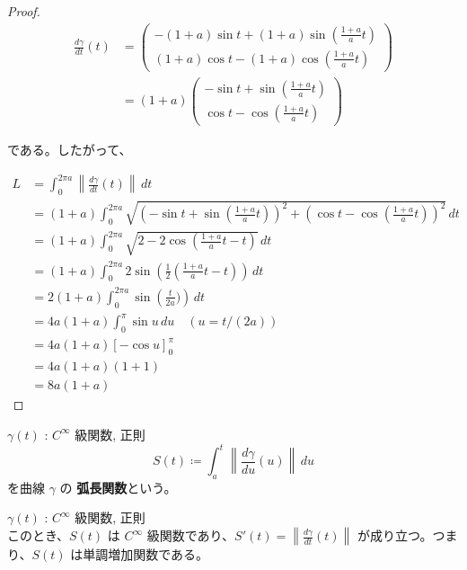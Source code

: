 \documentclass[article,paper=a4paper]{jlreq}
\begin{document}
\begin{proof}
    \begin{align*}
        \frac{d\gamma}{dt}(t) &= \begin{pmatrix}
        -(1+a)\sin t + (1+a)\sin\left(\frac{1+a}{a}t\right) \\
        (1+a)\cos t - (1+a)\cos\left(\frac{1+a}{a}t\right)
        \end{pmatrix}\\
        &= (1+a) \begin{pmatrix}
        -\sin t + \sin\left(\frac{1+a}{a}t\right) \\
        \cos t - \cos\left(\frac{1+a}{a}t\right)
        \end{pmatrix}
    \end{align*}

    である。したがって、

    \begin{align*}
        L &= \int_0^{2\pi a} \left\|\frac{d\gamma}{dt}(t)\right\| \,dt \\
        &= (1+a) \int_0^{2\pi a} \sqrt{(-\sin t + \sin\left(\frac{1+a}{a}t\right))^2 + (\cos t - \cos\left(\frac{1+a}{a}t\right))^2} \,dt \\
        &= (1+a) \int_0^{2\pi a} \sqrt{2 - 2\cos\left(\frac{1+a}{a}t - t\right)} \,dt \\
        &= (1+a) \int_0^{2\pi a} 2\sin\left(\frac{1}{2}\left(\frac{1+a}{a}t - t\right)\right) \,dt \\
        &= 2(1+a) \int_0^{2\pi a} \sin\left(\frac{t}{2a})\right) \,dt \\
        &= 4a(1+a) \int_0^{\pi} \sin u \,du \quad (u = t/(2a)) \\
        &= 4a(1+a) \left[-\cos u\right]_0^{\pi} \\
        &= 4a(1+a) (1 + 1) \\
        &= 8a(1+a)
    \end{align*}
\end{proof}

\begin{dfn}
    \quad $\gamma(t)$ : $C^{\infty}$ 級関数, 正則\\
    \[S(t) \coloneq \int_a^t \left\|\frac{d\gamma}{du}(u)\right\| \,d u \]
    を曲線 $\gamma$ の \textbf{弧長関数}という。
\end{dfn}

\begin{lem}
    \quad $\gamma(t)$ : $C^{\infty}$ 級関数, 正則\\
    このとき、$S(t)$ は $C^{\infty}$ 級関数であり、$S'(t) = \left\|\frac{d\gamma}{dt}(t)\right\|$ が成り立つ。つまり、$S(t)$ は単調増加関数である。
\end{lem}
\end{document}
